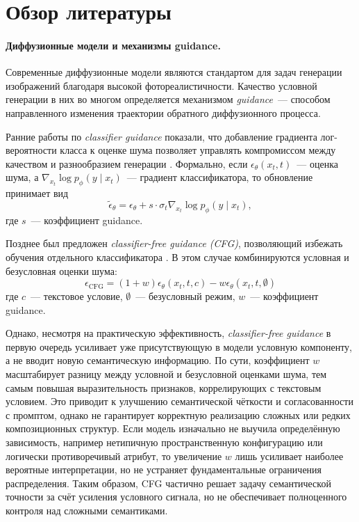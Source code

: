 \section{Обзор литературы}

\paragraph{Диффузионные модели и механизмы guidance.}
Современные диффузионные модели являются стандартом для задач генерации изображений благодаря высокой фотореалистичности. Качество условной генерации в них во многом определяется механизмом \textit{guidance}~--- способом направленного изменения траектории обратного диффузионного процесса.

Ранние работы по \textit{classifier guidance} показали, что добавление градиента лог-вероятности класса к оценке шума позволяет управлять компромиссом между качеством и разнообразием генерации \cite{dhariwal2021diffusion}. Формально, если $\epsilon_\theta(x_t, t)$~--- оценка шума, а $\nabla_{x_t} \log p_\phi(y \mid x_t)$~--- градиент классификатора, то обновление принимает вид
\[
\tilde{\epsilon}_\theta = \epsilon_\theta + s \cdot \sigma_t \nabla_{x_t} \log p_\phi(y \mid x_t),
\]
где $s$~--- коэффициент guidance.

Позднее был предложен \textit{classifier-free guidance (CFG)}, позволяющий избежать обучения отдельного классификатора \cite{ho2022classifierfree}. В этом случае комбинируются условная и безусловная оценки шума:
\[
\epsilon_{\text{CFG}} = (1 + w) \epsilon_\theta(x_t, t, c) - w \epsilon_\theta(x_t, t, \emptyset)
\]
где $c$~--- текстовое условие, $\emptyset$~--- безусловный режим, $w$~--- коэффициент guidance.

Однако, несмотря на практическую эффективность, \textit{classifier-free guidance} в первую очередь усиливает уже присутствующую в модели условную компоненту, а не вводит новую семантическую информацию. По сути, коэффициент $w$ масштабирует разницу между условной и безусловной оценками шума, тем самым повышая выразительность признаков, коррелирующих с текстовым условием. Это приводит к улучшению семантической чёткости и согласованности с промптом, однако не гарантирует корректную реализацию сложных или редких композиционных структур. Если модель изначально не выучила определённую зависимость, например нетипичную пространственную конфигурацию или логически противоречивый атрибут, то увеличение $w$ лишь усиливает наиболее вероятные интерпретации, но не устраняет фундаментальные ограничения распределения. Таким образом, CFG частично решает задачу семантической точности за счёт усиления условного сигнала, но не обеспечивает полноценного контроля над сложными семантиками.

